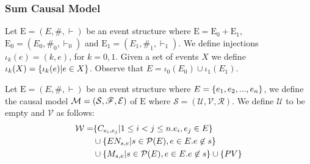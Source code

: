 \subsubsection{Sum Causal Model}

Let $\mathrm{E} = (E,\#,\vdash)$ be an event structure where
$\mathrm{E} = \mathrm{E}_0 + \mathrm{E}_1$,
$\mathrm{E}_0 = (E_0,\#_0,\vdash_0)$ and
$\mathrm{E}_1 = (E_1,\#_1,\vdash_1)$.
We define injections $\iota_k(e) = (k,e)$, for $k=0,1$.
Given a set of events $X$ we define
$\iota_k(X) = \{\iota_k(e)|e \in X\}$.
Observe that $E = \iota_0(E_0) \cup \iota_1(E_1)$.

Let $\mathrm{E} = (E,\#,\vdash)$ be an event structure where
$E = \{e_1, e_2, ...,e_n\}$, we define the causal model
$\mathcal{M} = (\mathcal{S},\mathscr{F},\mathcal{E})$ of $\mathrm{E}$ where
$\mathcal{S} = (\mathcal{U},\mathcal{V},\mathcal{R})$.
We define $\mathcal{U}$ to be empty and $\mathcal{V}$ as follows:
\begin{align*}
    \mathcal{W} =
     & \{C_{e_i,e_j} |  1 \leq i < j \leq n.
    e_i,e_j \in E \}                             \\
     & \cup \{EN_{s,e} | s \in \mathcal{P}(E),
    e \in E. e \not \in s \}                     \\
     & \cup \{M_{s,e} | s \in \mathcal{P}(E),
        e \in E. e \not \in s \} \cup \{PV\}
\end{align*}

